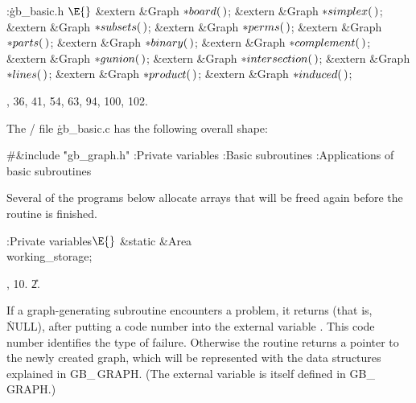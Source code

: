 \Y\B\4:\.{gb\_basic.h }\X${}\E{}$\6
\&{extern} \&{Graph} ${}{*}\\{board}(\,){}$;\6
\&{extern} \&{Graph} ${}{*}\\{simplex}(\,){}$;\6
\&{extern} \&{Graph} ${}{*}\\{subsets}(\,){}$;\6
\&{extern} \&{Graph} ${}{*}\\{perms}(\,){}$;\6
\&{extern} \&{Graph} ${}{*}\\{parts}(\,){}$;\6
\&{extern} \&{Graph} ${}{*}\\{binary}(\,){}$;\7
\&{extern} \&{Graph} ${}{*}\\{complement}(\,){}$;\6
\&{extern} \&{Graph} ${}{*}\\{gunion}(\,){}$;\6
\&{extern} \&{Graph} ${}{*}\\{intersection}(\,){}$;\6
\&{extern} \&{Graph} ${}{*}\\{lines}(\,){}$;\6
\&{extern} \&{Graph} ${}{*}\\{product}(\,){}$;\6
\&{extern} \&{Graph} ${}{*}\\{induced}(\,){}$;\par
{}, 36, 41, 54, 63, 94, 100, 102.\fi

The \CEE/ file \.{gb\_basic.c} has the following overall shape:

\Y\B\8\#\&{include} \.{"gb\_graph.h"}\6
\ATH\7
:Private variables\X\6
:Basic subroutines\X\6
:Applications of basic subroutines\X\par
\fi

Several of the programs below allocate arrays that will be freed again
before the routine is finished.

\Y\B\4:Private variables\X${}\E{}$\6
\&{static} \&{Area} \\{working\_storage};\par
{}, 10.
\U2.\fi

If a graph-generating subroutine encounters a problem, it returns \PB{$%
\NULL$}
(that is, \.{NULL}), after putting a code number into the external variable
. This code number identifies the type of failure.
Otherwise the routine returns a pointer to the newly created graph, which
will be represented with the data structures explained in {\sc GB\_\,GRAPH}.
(The external variable  is itself defined in {\sc GB\_%
\,GRAPH}.)

